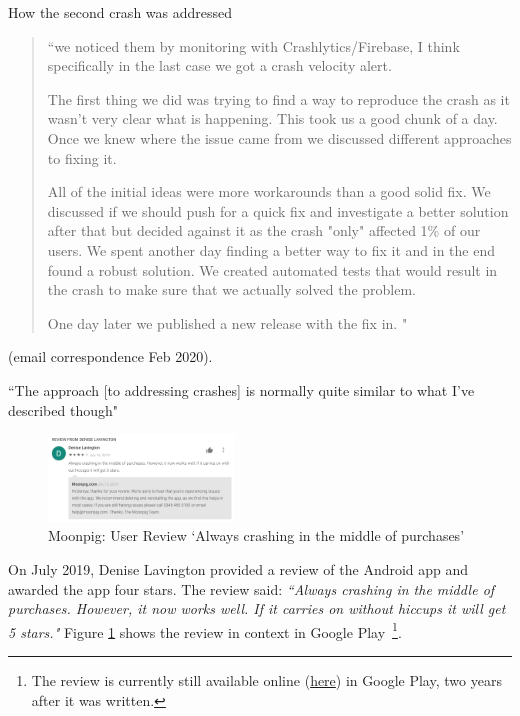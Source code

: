 How the second crash was addressed
\begin{quote}
    ``we noticed them by monitoring with Crashlytics/Firebase, I think specifically in the last case we got a crash velocity alert.

      The first thing we did was trying to find a way to reproduce the crash as it wasn't very clear what is happening. This took us a good chunk of a day. Once we knew where the issue came from we discussed different approaches to fixing it. 
      
      All of the initial ideas were more workarounds than a good solid fix. We discussed if we should push for a quick fix and investigate a better solution after that but decided against it as the crash "only" affected 1\% of our users. We spent another day finding a better way to fix it and in the end found a robust solution. We created automated tests that would result in the crash to make sure that we actually solved the problem.
      
      One day later we published a new release with the fix in. "
\end{quote} (email correspondence  Feb 2020).

``The approach [to addressing crashes] is normally quite similar to what I've described though"



\begin{figure}
    \includegraphics[width=0.44\textwidth]{images/google-play/Denise-Lavington-Review-moonpig-crashing-2019.png}
  \caption[Moonpig: User Review in Google Play `Always crashes...']{Moonpig: User Review `Always crashing in the middle of purchases'}
  \label{fig:gp-review-denise-lavington-always-crashes}
\end{figure}

On  July 2019, Denise Lavington provided a review of the Android app and awarded the app four stars. The review said: \emph{``Always crashing in the middle of purchases. However, it now works well. If it carries on without hiccups it will get 5 stars."} Figure \ref{fig:gp-review-denise-lavington-always-crashes} shows the review in context in Google Play~\footnote{The review is currently still available online (\href{https://play.google.com/store/apps/details?id=com.commonagency.moonpig.uk&reviewId=gp\%3AAOqpTOH68VB5eWqnu7UAqcC81_rbOfWl6dzL_g48jrg0T40MPWBkMxe01KjStXZF6F57nxZxQa-AqosRKDd1xQ}{here}) in Google Play, two years after it was written.}.

